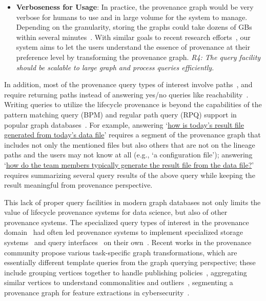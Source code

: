\documentclass[11pt]{article}
\newcommand{\eat}[1]{}
\newcommand{\introdrop}[1]{}
\begin{document}
\begin{itemize}
\item \textbf{Verboseness for Usage}: In practice, the provenance graph would be very verbose for humans to use and in large volume for the system to manage. Depending on the granularity, storing the graphs could take dozens of GBs within several minutes~\cite{linuxprov_abates@atc15}. With similar goals to recent research efforts~\cite{pql_harvard@ipaw08,provabs_pmissier@ipaw14,agg_lucmoreau@gam15,prov_segmentation@tapp16}, our system aims to let the users understand the essence of provenance at their preference level by transforming the provenance graph. \emph{R4: The query facility should be scalable to large graph and process queries efficiently.}
\end{itemize}

In addition, most of the provenance query types of interest involve paths~\cite{prov_challenges@website}, and require returning paths instead of answering yes/no queries like reachability~\cite{pql_harvard@ipaw08}. Writing queries to utilize the lifecycle provenance is beyond the capabilities of the pattern matching query (BPM) and regular path query (RPQ) support in popular graph databases~\cite{gquery_theory@pods13,survey_querylang@arix16,pgql_oracle@grades16}. For example, answering `\ul{how is today's result file generated from today's data file}' requires a segment of the provenance graph that includes not only the mentioned files but also others that are not on the lineage paths and the users may not know at all (e.g., `a configuration file'); answering `\ul{how do the team members typically generate the result file from the data file?}' requires summarizing several query results of the above query while keeping the result meaningful from provenance perspective.

This lack of proper query facilities in modern graph databases not only limits the value of lifecycle provenance systems for data science, but also of other provenance systems. 
The specialized query types of interest in the provenance domain~\cite{prov_challenges@website,pql_harvard@ipaw08} had often led provenance systems to implement specialized storage
systems~\cite{pass_harvard@atc06} and query interfaces~\cite{zoom_penn@icde08,bertram_lang@edbt10} on their own~\cite{freire2008provenance}. Recent works in the provenance community propose various task-specific graph transformations\introdrop{ for different tasks}, which are essentially different template queries from the graph querying perspective; these include
grouping vertices together to handle publishing policies~\cite{provabs_pmissier@ipaw14}, aggregating similar vertices\introdrop{ in a verbose graph} to understand commonalities and outliers~\cite{agg_lucmoreau@gam15},
segmenting a provenance graph \eat{via declarative language }for feature extractions in cybersecurity~\cite{prov_segmentation@tapp16}. 
\end{document}
